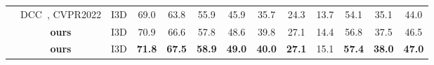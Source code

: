 \begin{table*}[t]
\begin{tabular}{c|c|c|ccccccc|ccc}
                                   & DCC~\cite{cvpr2022dcc}, CVPR2022                           & I3D                      & 69.0          & 63.8          & 55.9          & 45.9          & 35.7          & 24.3          & 13.7          & 54.1          & 35.1          & 44.0          \\
                                   \cmidrule{2-13}
& \textbf{ours}                                   			& I3D                      & 70.9          & 66.6          & 57.8          & 48.6          & 39.8          & 27.1          & 14.4          & 56.8          & 37.5          & 46.5          \\
                                   & \textbf{ours}                            				& I3D                      & \textbf{71.8} & \textbf{67.5} & \textbf{58.9} & \textbf{49.0} & \textbf{40.0} & \textbf{27.1} & 15.1          & \textbf{57.4} & \textbf{38.0} & \textbf{47.0} \\
    \bottomrule
	\end{tabular}
    \vspace{-0.5em}
\end{table*}




